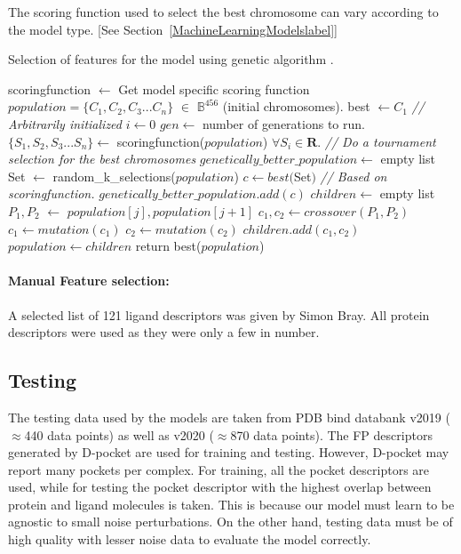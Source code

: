 \documentclass[11pt]{article}
\begin{document}
The scoring function used to select the best chromosome can vary according to the model type. [See Section~\ref{MachineLearningModelslabel}]

\begin{algorithm}
\caption{Selection of features for the model using genetic algorithm \cite{genetic_algorithm}.}
\label{alg:GeneticAlgo}
\begin{algorithmic}[1]
\State scoringfunction $\gets$ Get model specific scoring function
\State $ population = \{C_1, C_2, C_3... C_n\}$ $\in$ $\mathbb{B}^{456}$ (initial chromosomes).
\State best $\gets C_1$  \textit{// Arbitrarily initialized}
\State $i \gets 0$
\State $gen \gets$ number of generations to run.
          \State $\{S_1, S_2, S_3... S_n\} \gets$ scoringfunction($population$) $\forall S_i \in \mathbf{R}$.
          \State \textit{// Do a tournament selection for the best chromosomes}
          \State $genetically\_better\_population \gets$ empty list
              \State Set $\gets$ random\_k\_selections($population$)
              \State $c \gets best($Set$)$ \textit{// Based on scoringfunction.}
              \State $genetically\_better\_population.add(c)$
          \EndFor
          \State $children \gets$ empty list
              \State $P_1, P_2$ $\gets$ $population[j], population[j+1]$
              \State $c_1, c_2 \gets crossover(P_1, P_2)$
              \State $c_1 \gets mutation(c_1)$
              \State $c_2 \gets mutation(c_2)$
              \State $children.add(c_1, c_2)$
          \EndFor
          \State $population \gets children$
      \EndFor
\State return best($population$)
\EndProcedure
\end{algorithmic}
\end{algorithm}

\paragraph{Manual Feature selection:}
A selected list of 121 ligand descriptors was given by Simon Bray. 
All protein descriptors were used as they were only a few in number.

\subsection{Testing}
The testing data used by the models are taken from PDB bind databank v2019 ($\approx$440 data points) as well as v2020 ($\approx$870 data points)\footnotemark[2]. The FP descriptors generated by D-pocket are used for training and testing. However, D-pocket may report many pockets per complex. For training, all the pocket descriptors are used, while for testing the pocket descriptor with the highest overlap between protein and ligand molecules is taken. This is because our model must learn to be agnostic to small noise perturbations. On the other hand, testing data must be of high quality with lesser noise data to evaluate the model correctly.
\end{document}
